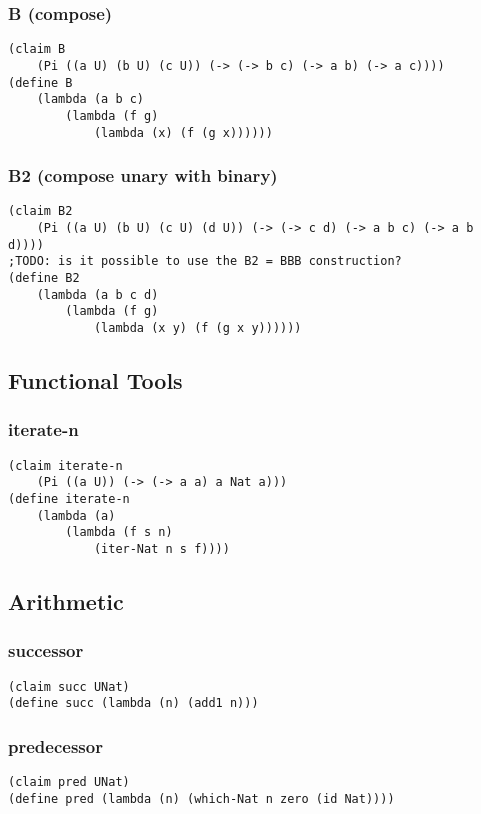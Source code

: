 \subsubsection{B (compose)}
\begin{verbatim}
(claim B
    (Pi ((a U) (b U) (c U)) (-> (-> b c) (-> a b) (-> a c))))
(define B
    (lambda (a b c)
        (lambda (f g)
            (lambda (x) (f (g x))))))
\end{verbatim}

\subsubsection{B2 (compose unary with binary)}
\begin{verbatim}
(claim B2
    (Pi ((a U) (b U) (c U) (d U)) (-> (-> c d) (-> a b c) (-> a b d))))
;TODO: is it possible to use the B2 = BBB construction?
(define B2
    (lambda (a b c d)
        (lambda (f g)
            (lambda (x y) (f (g x y))))))
\end{verbatim}


\subsection{Functional Tools}

\subsubsection{iterate-n}
\begin{verbatim}
(claim iterate-n
    (Pi ((a U)) (-> (-> a a) a Nat a)))
(define iterate-n
    (lambda (a)
        (lambda (f s n)
            (iter-Nat n s f))))
\end{verbatim}


\subsection{Arithmetic}

\subsubsection{successor}
\begin{verbatim}
(claim succ UNat)
(define succ (lambda (n) (add1 n)))
\end{verbatim}

\subsubsection{predecessor}
\begin{verbatim}
(claim pred UNat)
(define pred (lambda (n) (which-Nat n zero (id Nat))))
\end{verbatim}

